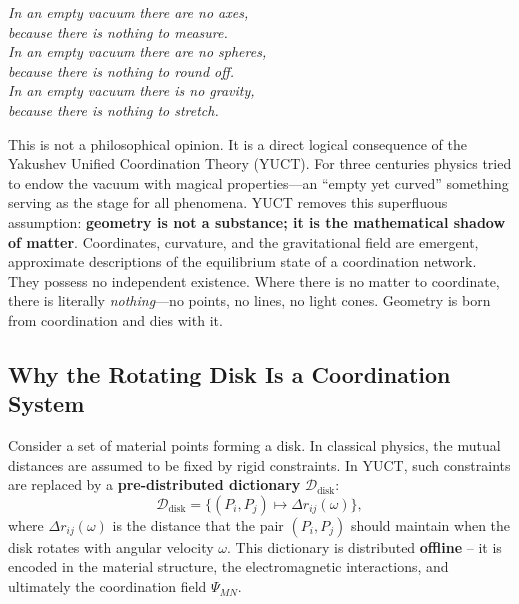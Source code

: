 \documentclass[12pt,a4paper]{article}
\begin{document}
	\begin{tcolorbox}[
		title={\bfseries A Logically Elementary Statement},
		colback=blue!3!white,
		colframe=blue!50!black,
		fonttitle=\bfseries,
		sharp corners
		]
		\small
		\textit{In an empty vacuum there are no axes,\\
			because there is nothing to measure.\\
			In an empty vacuum there are no spheres,\\
			because there is nothing to round off.\\
			In an empty vacuum there is no gravity,\\
			because there is nothing to stretch.}
		
		\medskip
		This is not a philosophical opinion. It is a direct logical consequence of the Yakushev
		Unified Coordination Theory (YUCT). For three centuries physics tried to endow the vacuum
		with magical properties---an ``empty yet curved'' something serving as the stage for all
		phenomena. YUCT removes this superfluous assumption: \textbf{geometry is not a substance;
			it is the mathematical shadow of matter}. Coordinates, curvature, and the gravitational
		field are emergent, approximate descriptions of the equilibrium state of a coordination
		network. They possess no independent existence. Where there is no matter to coordinate,
		there is literally \textit{nothing}---no points, no lines, no light cones. Geometry is born
		from coordination and dies with it.
	\end{tcolorbox}
	
	\subsection{Why the Rotating Disk Is a Coordination System}
	\label{subsec:disk-coordination}
	
	Consider a set of material points forming a disk. In classical physics, the mutual distances are assumed to be fixed by rigid constraints. In YUCT, such constraints are replaced by a \textbf{pre-distributed dictionary} \(\mathcal{D}_{\text{disk}}\):
	\[
	\mathcal{D}_{\text{disk}} = \bigl\{ (P_i, P_j) \mapsto \Delta r_{ij}(\omega) \bigr\},
	\]
	where \(\Delta r_{ij}(\omega)\) is the distance that the pair \((P_i,P_j)\) should maintain when the disk rotates with angular velocity \(\omega\). This dictionary is distributed \textbf{offline} -- it is encoded in the material structure, the electromagnetic interactions, and ultimately the coordination field \(\Psi_{MN}\).
	
\end{document}
